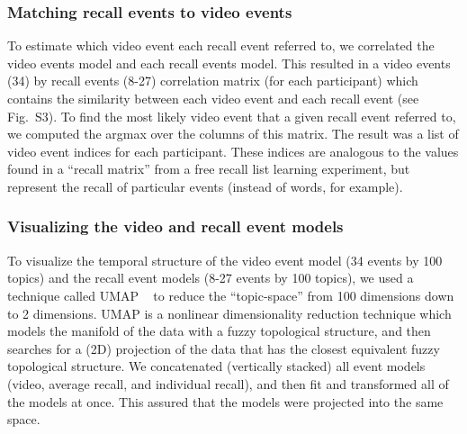 \documentclass{article}
\newcommand{\matchmats}{S3}
\begin{document}
\subsubsection*{Matching recall events to video events}
To estimate which video event each recall event referred to, we correlated the video events model and each recall events model. This resulted in a video events (34) by recall events (8-27) correlation matrix (for each participant) which contains the similarity between each video event and each recall event (see Fig.~\matchmats).  To find the most likely video event that a given recall event referred to, we computed the argmax over the columns of this matrix.  The result was a list of video event indices for each participant. These indices are analogous to the values found in a ``recall matrix'' from a free recall list learning experiment, but represent the recall of particular events (instead of words, for example).

\subsubsection*{Visualizing the video and recall event models}
To visualize the temporal structure of the video event model (34 events by 100 topics) and the recall event models (8-27 events by 100 topics), we used a technique called UMAP ~\citep{McInHeal18} to reduce the ``topic-space'' from 100 dimensions down to 2 dimensions. UMAP is a nonlinear dimensionality reduction technique which models the manifold of the data with a fuzzy topological structure, and then searches for a (2D) projection of the data that has the closest equivalent fuzzy topological structure. We concatenated (vertically stacked) all event models (video, average recall, and individual recall), and then fit and transformed all of the models at once. This assured that the models were projected into the same space.
\end{document}
